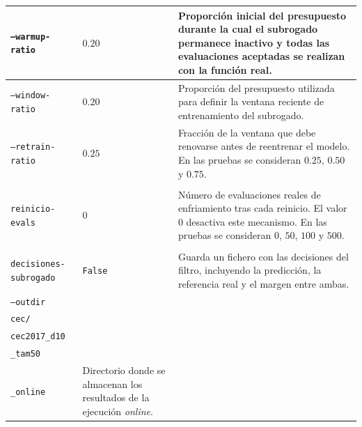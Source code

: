 \begin{longtable}[htbp]{|p{4.2cm}|p{2.3cm}|p{4.75cm}|}
    \texttt{--warmup-ratio}
                       & \(0.20\)
                       & Proporción inicial del presupuesto durante la cual el subrogado permanece
    inactivo y todas las evaluaciones aceptadas se realizan con la función real.                                               \\
    \hline

    \texttt{--window-ratio}
                       & \(0.20\)
                       & Proporción del presupuesto utilizada para definir la ventana reciente de
    entrenamiento del subrogado.                                                                                               \\
    \hline

    \texttt{--retrain-ratio}
                       & \(0.25\)
                       & Fracción de la ventana que debe renovarse antes de reentrenar el modelo.
    En las pruebas se consideran \(0.25\), \(0.50\) y \(0.75\).                                                                \\
    \hline

    \makecell[l]{\texttt{--cooldown-}                                                                                          \\\texttt{reinicio-evals}}
                       & \(0\)
                       & Número de evaluaciones reales de enfriamiento tras cada reinicio. El valor
    \(0\) desactiva este mecanismo. En las pruebas se consideran \(0\), \(50\),
    \(100\) y \(500\).                                                                                                         \\
    \hline

    \makecell[l]{\texttt{--guardar-}                                                                                           \\\texttt{decisiones-subrogado}}
                       & \texttt{False}
                       & Guarda un fichero con las decisiones del filtro, incluyendo la predicción,
    la referencia real y el margen entre ambas.                                                                                \\
    \hline

    \texttt{--outdir}
                       & \makecell[l]{\texttt{results/}                                                                        \\\texttt{cec/}                           \\\texttt{cec2017\_d10}                  \\\texttt{\_tam50}                       \\\texttt{\_online}}
                       & Directorio donde se almacenan los resultados de la ejecución \textit{online}.                         \\
    \hline


\end{longtable}
